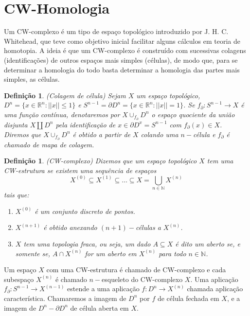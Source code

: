 \documentclass[12pt]{book}
\newtheorem{definicao}[teorema]{Definição}
\newcommand{\skeleton}[1]{X^{(#1)}}
\begin{document}
	\section{CW-Homologia}\label{secao_cw_complexo}
	Um CW-complexo é um tipo de espaço topológico introduzido por J. H. C. Whitehead, que teve como objetivo inicial facilitar alguns cálculos em teoria de homotopia. A ideia é que um CW-complexo é construído com sucessivas colagens (identificações) de outros espaços mais simples (células), de modo que, para se determinar a homologia do todo basta determinar a homologia das partes mais simples, as células.
	\begin{definicao}
		(Colagem de célula) Sejam $X$ um espaço topológico, $D^{n}=\{x\in \mathbb{R}^{n} : ||x|| \leq 1\}$ e $S^{n-1} = \partial D^{n}=\{x\in \mathbb{R}^{n} : ||x|| = 1\}$. Se $f_{\partial}:S^{n-1} \to X$ é uma função contínua, denotaremos por $X\cup_{f_{\partial}}D^{n}$ o espaço quociente da união disjunta $X \coprod D^{n}$ pela identificação de $x \in \partial D^{x} = S^{n-1}$ com $f_{\partial}(x) \in X$. Diremos que $X\cup_{f_{\partial}}D^{n}$ é obtido a partir de $X$ colando uma $n-$célula e $f_{\partial}$ é chamado de mapa de colagem.
	\end{definicao}
	
	\begin{definicao}
		(CW-complexo) Dizemos que um espaço topológico $X$ tem uma CW-estrutura se existem uma sequência de espaços
		$$
		\skeleton{0} \subseteq \skeleton{1} \subseteq \dots \subseteq X = \bigcup \limits_{n\in \mathbb{N}} \skeleton{n}
		$$ 
		tais que:
		\begin{enumerate}
			\item $\skeleton{0}$ é um conjunto discreto de pontos.
			
			\item $\skeleton{n+1}$ é obtido anexando $(n+1)-$células a $\skeleton{n}$.
			
			\item $X$ tem uma topologia fraca, ou seja, um dado $A \subseteq X$ é dito um aberto se, e somente se, $A \cap \skeleton{n}$ for um aberto em $\skeleton{n}$ para todo $n \in \mathbb{N}$.
		\end{enumerate}
	\end{definicao}
	
	Um espaço $X$ com uma CW-estrutura é chamado de CW-complexo e cada subespaço $\skeleton{n}$ é chamado $n-$esqueleto do CW-complexo $X$. Uma aplicação $f_{\partial}:S^{n-1} \to \skeleton{n-1}$ estende a uma aplicação $f:D^{n} \to \skeleton{n}$ chamada aplicação característica. Chamaremos a imagem de $D^{n}$ por $f$ de célula fechada em $X$, e a imagem de $D^{n} - \partial D^{n}$ de célula aberta em $X$.
	
\end{document}
